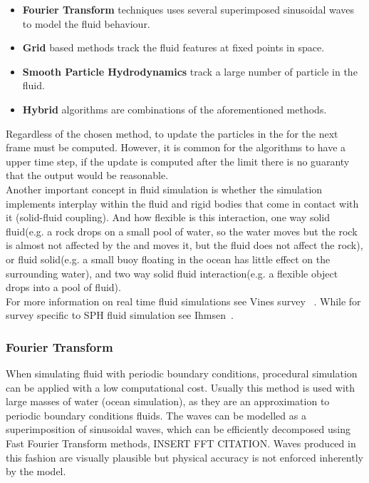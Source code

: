 \begin{itemize}
\item \textbf{Fourier Transform} techniques uses several superimposed sinusoidal waves to model the fluid behaviour.
\item \textbf{Grid} based methods track the fluid features at fixed points in space.
\item \textbf{Smooth Particle Hydrodynamics} track a large number of particle in the fluid.
\item \textbf{Hybrid} algorithms are combinations of the aforementioned methods.\\
\end{itemize}

Regardless of the chosen method, to update the particles in the for the next frame must be computed.
However, it is common for the algorithms to have a upper time step, if the update is computed after the limit there is no guaranty that the output would be reasonable.\\

Another important concept in fluid simulation is whether the simulation implements interplay within the fluid and rigid bodies that come in contact with it (solid-fluid coupling).
And how flexible is this interaction, one way solid fluid(e.g. a rock drops on a small pool of water, so the water moves but the rock is almost not affected by the  and moves it, but the fluid does not affect the rock), or fluid solid(e.g. a small buoy floating in the ocean has little effect on the surrounding water), and two way solid fluid interaction(e.g. a flexible object drops into a pool of fluid).\\

For more information on real time fluid simulations see Vines survey ~\cite{Vines2012}.
While for survey specific to SPH fluid simulation see Ihmsen~\cite{Ihmsen2014}.

\subsubsection{Fourier Transform}

When simulating fluid with periodic boundary conditions, procedural simulation can be applied with a low computational cost.
Usually this method is used with large masses of water (ocean simulation), as they are an approximation to periodic boundary conditions fluids.
The waves can be modelled as a superimposition of sinusoidal waves, which can be efficiently decomposed using Fast Fourier Transform methods, INSERT FFT CITATION.
Waves produced in this fashion are visually plausible but physical accuracy is not enforced inherently by the model.\\

